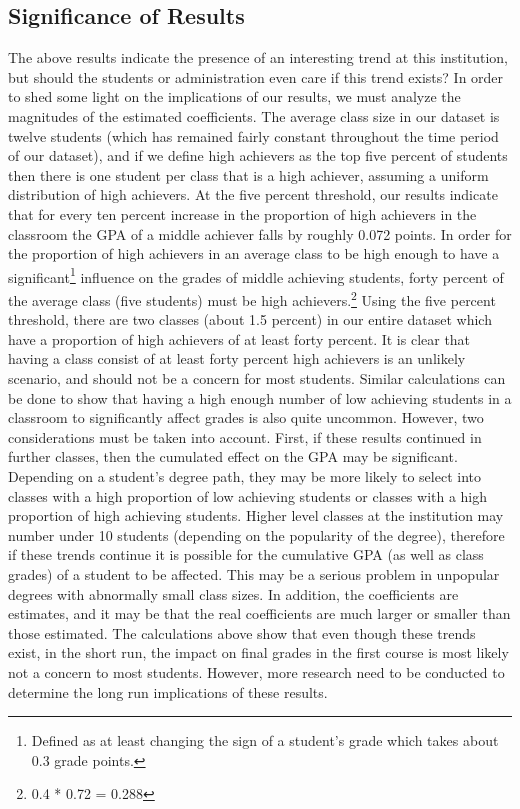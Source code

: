 \subsection{Significance of Results}\label{results:sor}

The above results indicate the presence of an interesting trend at this institution, but should the students or administration even care if this trend exists? In order to shed some light on the implications of our results, we must analyze the magnitudes of the estimated coefficients. 
The average class size in our dataset is twelve students (which has remained fairly constant throughout the time period of our dataset), and if we define high achievers as the top five percent of students then there is one student per class that is a high achiever,  assuming a uniform distribution of high achievers. 
At the five percent threshold, our results indicate that for every ten percent increase in the proportion of high achievers in the classroom the GPA of a middle achiever falls by roughly 0.072 points. 
In order for the proportion of high achievers in an average class to be high enough to have a significant\footnote{Defined as at least changing the sign of a student's grade which takes about 0.3 grade points.} influence on the grades of middle achieving students, forty percent of the average class (five students) must be high achievers.\footnote{0.4 * 0.72 = 0.288} Using the five percent threshold, there are two classes (about 1.5 percent) in our entire dataset which have a proportion of high achievers of at least forty percent. 
It is clear that having a class consist of at least forty percent high achievers is an unlikely scenario, and should not be a concern for most students. 
Similar calculations can be done to show that having a high enough number of low achieving students in a classroom to significantly affect grades is also quite uncommon. 
However, two considerations must be taken into account. 
First, if these results continued in further classes, then the cumulated effect on the GPA may be significant. 
Depending on a student's degree path, they may be more likely to select into classes with a high proportion of low achieving students or classes with a high proportion of high achieving students. 
Higher level classes at the institution may number under 10 students (depending on the popularity of the degree), therefore if these trends continue it is possible for the cumulative GPA (as well as class grades) of a student to be affected. 
This may be a serious problem in unpopular degrees with abnormally small class sizes. 
In addition, the coefficients are estimates, and it may be that the real coefficients are much larger or smaller than those estimated. 
The calculations above show that even though these trends exist, in the short run, the impact on final grades in the first course is most likely not a concern to most students. 
However, more research need to be conducted to determine the long run implications of these results. 

